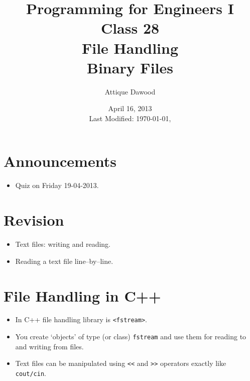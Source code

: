 \documentclass[12pt,a4paper]{article}
\title{\vspace{-2cm}Programming for Engineers I\\Class 28\\File Handling\\Binary Files}
\author{Attique Dawood}
\date{April 16, 2013\\[0.2cm] Last Modified: \today, \currenttime}
\begin{document}
\maketitle
\section{Announcements}
\begin{itemize}
\item Quiz on Friday 19-04-2013.
\end{itemize}
\section{Revision}
\begin{itemize}
\item Text files: writing and reading.
\item Reading a text file line--by--line.
\end{itemize}
\section{File Handling in C++}
\begin{itemize}
\item In C++ file handling library is \verb|<fstream>|.
\item You create `objects' of type (or class) \verb|fstream| and use them for reading to and writing from files.
\item Text files can be manipulated using \verb|<<| and \verb|>>| operators exactly like \verb|cout/cin|.
\end{itemize}
\end{document}
